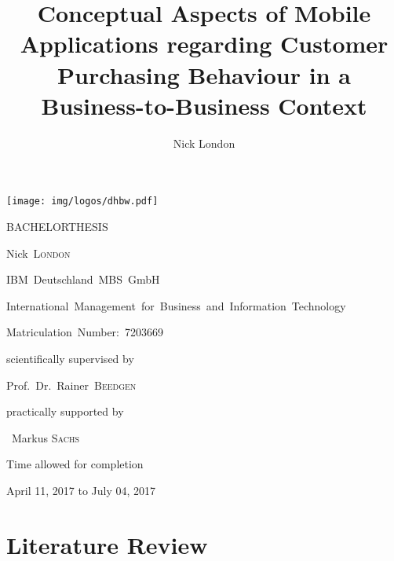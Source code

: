 \documentclass[12pt,a4paper,final,oneside,openright,onecolumn,titlepage]{scrbook}
\author{Nick London}
\title{Conceptual Aspects of Mobile Applications regarding Customer Purchasing Behaviour in a Business-to-Business Context}
\newcounter{savepage}
\begin{document}
\begin{titlepage}
	\texttt{[image: img/logos/dhbw.pdf]}
	\hfill
	\par
	\centering
	\vfill
	{\huge \textsc{\MakeUppercase{Bachelorthesis}}\par}
	\vspace{2em}
	{\Huge \textbf{\thetitle}\par}
	\vspace{1.5em}
	{\large Nick~\textsc{London}\par}
	\vfill
	{\small IBM~Deutschland~MBS~GmbH\par
	International~Management~for~Business~and~Information~Technology\par
	Matriculation~Number:~7203669}
	\vfill
	{scientifically supervised by\par Prof.~Dr.~Rainer~\textsc{Beedgen}\par}
	\par\vspace{1em}
	{practically supported by\par ~Markus \textsc{Sachs}\par}
	\vspace{2em}
	{Time allowed for completion\par April 11, 2017 to July 04, 2017\par}
\end{titlepage}

\setcounter{page}{1}

\tableofcontents

\newpage
{}
\listoffigures

\newpage
{}
\listoftables



\newpage

\setcounter{page}{1}


\chapter{Literature Review}





\newpage
{}
\addtocounter{savepage}{1}
\setcounter{page}{\thesavepage}
\end{document}
